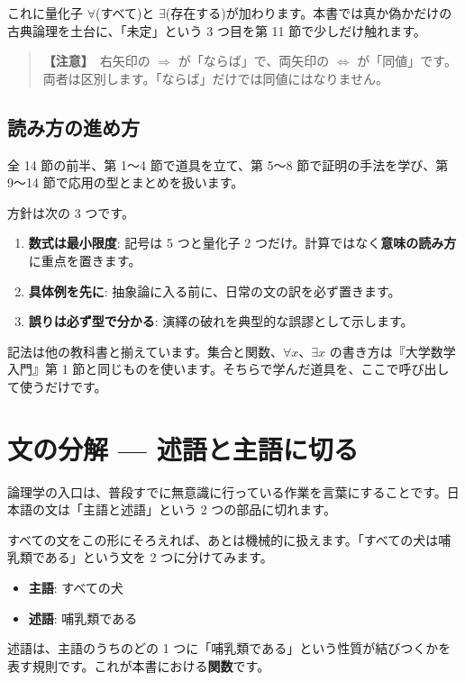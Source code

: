 \documentclass{article}
\begin{document}
これに量化子 \(\forall\)(すべて)と \(\exists\)(存在する)が加わります。本書では真か偽かだけの古典論理を土台に、「未定」という 3 つ目を第 11 節で少しだけ触れます。

\begin{quote}
\textbf{【注意】}\ 右矢印の \(\Rightarrow\) が「ならば」で、両矢印の \(\Leftrightarrow\) が「同値」です。両者は区別します。「ならば」だけでは同値にはなりません。
\end{quote}

\subsection{読み方の進め方}

全 14 節の前半、第 1〜4 節で道具を立て、第 5〜8 節で証明の手法を学び、第 9〜14 節で応用の型とまとめを扱います。

方針は次の 3 つです。

\begin{enumerate}
\item \textbf{数式は最小限度}: 記号は 5 つと量化子 2 つだけ。計算ではなく\textbf{意味の読み方}に重点を置きます。
\item \textbf{具体例を先に}: 抽象論に入る前に、日常の文の訳を必ず置きます。
\item \textbf{誤りは必ず型で分かる}: 演繹の破れを典型的な誤謬として示します。
\end{enumerate}

記法は他の教科書と揃えています。集合と関数、\(\forall x\)、\(\exists x\) の書き方は『大学数学入門』第 1 節と同じものを使います。そちらで学んだ道具を、ここで呼び出して使うだけです。

\section{文の分解 — 述語と主語に切る}

論理学の入口は、普段すでに無意識に行っている作業を言葉にすることです。日本語の文は「主語と述語」という 2 つの部品に切れます。

すべての文をこの形にそろえれば、あとは機械的に扱えます。「すべての犬は哺乳類である」という文を 2 つに分けてみます。

\begin{itemize}
\item \textbf{主語}: すべての犬
\item \textbf{述語}: 哺乳類である
\end{itemize}

述語は、主語のうちのどの 1 つに「哺乳類である」という性質が結びつくかを表す規則です。これが本書における\textbf{関数}です。
\end{document}
